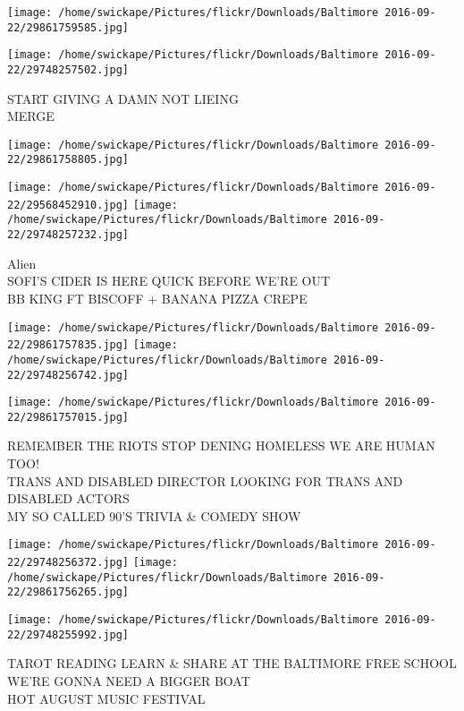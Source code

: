 \documentclass[10pt,letterpaper]{article}
\begin{document}
\texttt{[image: /home/swickape/Pictures/flickr/Downloads/Baltimore 2016-09-22/29861759585.jpg]}

\vspace{0.25in}
\texttt{[image: /home/swickape/Pictures/flickr/Downloads/Baltimore 2016-09-22/29748257502.jpg]}

START GIVING A DAMN NOT LIEING\\
MERGE
\pagebreak

\texttt{[image: /home/swickape/Pictures/flickr/Downloads/Baltimore 2016-09-22/29861758805.jpg]}

\vspace{0.25in}
\texttt{[image: /home/swickape/Pictures/flickr/Downloads/Baltimore 2016-09-22/29568452910.jpg]}
\texttt{[image: /home/swickape/Pictures/flickr/Downloads/Baltimore 2016-09-22/29748257232.jpg]}

Alien\\
SOFI'S CIDER IS HERE QUICK BEFORE WE'RE OUT\\
BB KING FT BISCOFF + BANANA PIZZA CREPE
\pagebreak

\texttt{[image: /home/swickape/Pictures/flickr/Downloads/Baltimore 2016-09-22/29861757835.jpg]}
\texttt{[image: /home/swickape/Pictures/flickr/Downloads/Baltimore 2016-09-22/29748256742.jpg]}

\vspace{0.25in}
\texttt{[image: /home/swickape/Pictures/flickr/Downloads/Baltimore 2016-09-22/29861757015.jpg]}

REMEMBER THE RIOTS STOP DENING HOMELESS WE ARE HUMAN TOO!\\
TRANS AND DISABLED DIRECTOR LOOKING FOR TRANS AND DISABLED ACTORS\\
MY SO CALLED 90'S TRIVIA \& COMEDY SHOW
\pagebreak

\texttt{[image: /home/swickape/Pictures/flickr/Downloads/Baltimore 2016-09-22/29748256372.jpg]}
\texttt{[image: /home/swickape/Pictures/flickr/Downloads/Baltimore 2016-09-22/29861756265.jpg]}

\texttt{[image: /home/swickape/Pictures/flickr/Downloads/Baltimore 2016-09-22/29748255992.jpg]}

TAROT READING LEARN \& SHARE AT THE BALTIMORE FREE SCHOOL\\
WE'RE GONNA NEED A BIGGER BOAT\\
HOT AUGUST MUSIC FESTIVAL
\pagebreak
\end{document}
